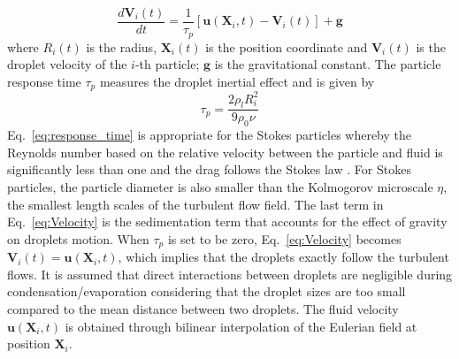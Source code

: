 \documentclass[draft,jgrga]{AGUTeX}
\newcommand{\Eq}[1]{Eq.~\eqref{#1}} \newcommand{\Fig}[1]{Figure~\ref{#1}}
\begin{document}
\begin{article}
\begin{equation}
\frac{d\mathbf{V}_i(t)}{dt}=\frac{1}{\tau_{p}}[\mathbf{u}(\mathbf{X}_i,t)-\mathbf{V}_i(t)]+\mathbf{g}\label{eq:Velocity}
\end{equation}
where $R_i(t)$ is the radius, $\mathbf{X}_i(t)$ is the position
coordinate and $\mathbf{V}_i(t)$ is the droplet velocity of the $i$-th particle; $\mathbf{g}$ is the gravitational constant.
The particle response time $\tau_p$ measures the droplet inertial effect and is given by
\begin{equation}
\tau_{p}=\frac{2\rho_{l}R_i^{2}}{9\rho_{0}\nu}
\label{eq:response_time}
\end{equation}
\Eq{eq:response_time} is appropriate for the Stokes particles whereby the Reynolds number 
based on the relative velocity between the particle and fluid is significantly less than one and the 
drag follows the Stokes law \cite{Eaton94}. For Stokes particles, the particle diameter is also smaller than the Kolmogorov microscale $\eta$, the smallest length scales of the turbulent flow field.
The last term in \Eq{eq:Velocity} is the sedimentation term that accounts for the effect of 
gravity on droplets motion. When $\tau_{p}$ is set to be zero, \Eq{eq:Velocity} becomes $\mathbf{V}_i(t)=\mathbf{u}(\mathbf{X}_i,t)$, 
which implies that the droplets exactly follow the turbulent flows. 
It is assumed that direct interactions between droplets are negligible during 
condensation/evaporation considering that the droplet sizes are too small compared to the mean distance between two droplets. The fluid velocity $\mathbf{u}(\mathbf{X}_i, t)$ 
is obtained through bilinear interpolation of the Eulerian field at position $\mathbf{X}_i$.


\end{article}
\end{document}
